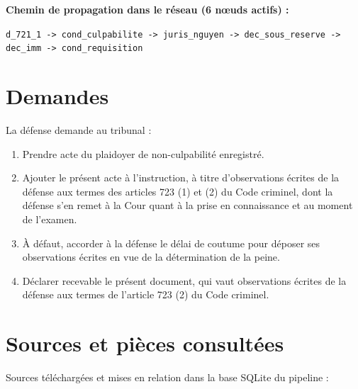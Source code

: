 \documentclass[12pt,letterpaper,oneside]{article}
\begin{document}
\textbf{Chemin de propagation dans le réseau (6 nœuds actifs) :}

\texttt{d\_721\_1 -> cond\_culpabilite -> juris\_nguyen -> dec\_sous\_reserve -> dec\_imm -> cond\_requisition}


\section{Demandes}
La défense demande au tribunal :

\begin{enumerate}[leftmargin=*]
\item Prendre acte du plaidoyer de non-culpabilité enregistré.
\item Ajouter le présent acte à l'instruction, à titre d'observations écrites de la défense aux termes des articles 723 (1) et (2) du Code criminel, dont la défense s'en remet à la Cour quant à la prise en connaissance et au moment de l'examen.
\item À défaut, accorder à la défense le délai de coutume pour déposer ses observations écrites en vue de la détermination de la peine.
\item Déclarer recevable le présent document, qui vaut observations écrites de la défense aux termes de l'article 723 (2) du Code criminel.
\end{enumerate}

\section{Sources et pièces consultées}
Sources téléchargées et mises en relation dans la base SQLite du pipeline :
\end{document}
